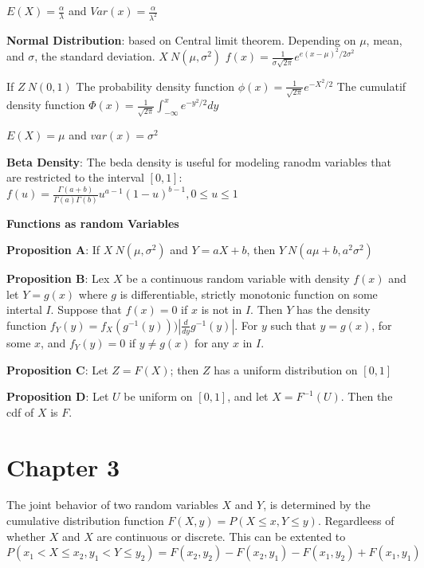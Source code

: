 \documentclass{article}
\begin{document}
\begin{multicols*}{2}
    $E(X)=\frac{\alpha}{\lambda}$ and $Var(x) = \frac{\alpha}{\lambda^2}$

    \textbf{Normal Distribution}: based on Central limit theorem.
    Depending on $\mu$, mean, and $\sigma$, the standard deviation. $X~N\left(\mu, \sigma^2\right)$
    $f(x) = \frac{1}{\sigma\sqrt{2\pi}}e^{e(x-\mu)^2/2\sigma^2}$


    If $Z~N(0, 1)$
    The probability density function $\phi(x) =\frac{1}{\sqrt{2\pi}} e^{-X^2/2}$
    The cumulatif density function $\Phi(x) =\frac{1}{\sqrt{2\pi}} \int_{-\infty}^x e^{-y^2/2}dy$

    $E(X) = \mu$ and $var(x) = \sigma^2$

    \textbf{Beta Density}: The beda density is useful for modeling ranodm variables that are restricted to the interval $\left[0, 1\right]$:
    $f(u) = \frac{\Gamma(a+b)}{\Gamma(a) \Gamma(b)} u^{a-1} (1-u)^{b-1}, 0 \leq u \leq 1$

    \textbf{Functions as random Variables}

    \textbf{Proposition A}: If $X~N(\mu, \sigma^2)$ and $Y=aX+b$, then $Y~N(a\mu +b, a^2\sigma^2)$

    \textbf{Proposition B}: Lex $X$ be a continuous random variable with density $f(x)$ and let $Y=g(x)$
    where $g$ is differentiable, strictly monotonic function on some intertal $I$.
    Suppose that $f(x) = 0$ if $x$ is not in $I$.
    Then $Y$ has the density function $f_Y(y) = f_X(g^{-1}(y))) \left| \frac{d}{dy}g^{-1}(y) \right|$.
    For $y$ such that $y=g(x)$, for some $x$, and $f_Y(y) = 0$ if $y \neq g(x)$ for any $x$ in $I$.

    \textbf{Proposition C}:
    Let $Z=F(X)$; then $Z$ has a uniform distribution on $\left[0, 1\right]$

    \textbf{Proposition D}:
    Let $U$ be uniform on $\left[0, 1\right]$, and let $X=F^{-1}\left(U\right)$. Then the cdf of $X$ is $F$.

    \section{Chapter 3}

    The joint behavior of two random variables $X$ and $Y$, is determined by the cumulative distribution function $F(X, y) = P(X \leq x, Y \leq y)$.
    Regardleess of whether $X$ and $X$ are continuous or discrete.
    This can be extented to $P(x_1 < X \leq x_2, y_1 < Y \leq y_2) = F(x_2, y_2) - F(x_2, y_1) - F(x_1, y_2) + F(x_1, y_1)$


\end{multicols*}
\end{document}
